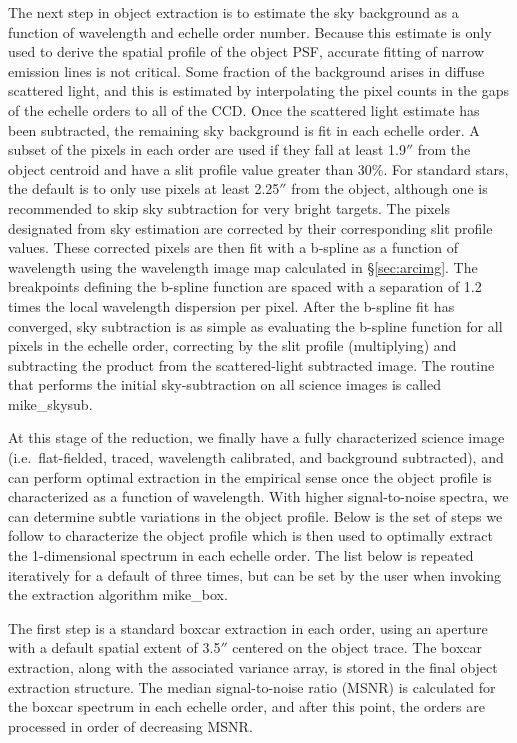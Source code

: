 \documentclass[]{emulateapj}
\begin{document}
The next step in object extraction is to estimate the sky
background as a function of wavelength and echelle order number.  
Because this estimate is only used to derive the spatial profile
of the object PSF, accurate fitting of narrow emission lines is not
critical.
Some fraction of the background arises in diffuse scattered light, and
this is estimated by interpolating the pixel counts in the gaps of 
the echelle orders to all of the CCD.  Once the scattered light estimate
has been subtracted, the remaining sky background is fit in each echelle order.
A subset of the pixels in each order are used if they fall at least 1.9$''$ from
the object centroid and have a slit profile value greater than 30\%.
For standard stars, the default is to only use pixels at least 2.25$''$ from the
object, although one is recommended to skip sky subtraction for very
bright targets.  The pixels designated from sky estimation are corrected by their
corresponding slit profile values.  These corrected pixels are then fit 
with a b-spline as a function of wavelength using the wavelength image map 
calculated in \S\ref{sec:arcimg}.  The breakpoints defining the b-spline function
are spaced with a separation of 1.2 times the local wavelength dispersion
per pixel.  After the b-spline fit has converged, sky subtraction is as simple
as evaluating the b-spline function for all pixels in the echelle order, 
correcting by the slit profile (multiplying) and subtracting the product 
from the scattered-light subtracted image.
The routine that performs the initial sky-subtraction on all science images
is called mike\_skysub.

At this stage of the reduction, we finally have a fully characterized 
science image (i.e.\ flat-fielded, traced, 
wavelength calibrated, and background subtracted), 
and can perform optimal extraction in 
the empirical sense \citep[e.g.][]{optimal}
once the object profile is characterized as a function
of wavelength.  With higher signal-to-noise spectra,
we can determine subtle variations in the object profile.
Below is the set of steps we follow to characterize the object profile 
which is then used to optimally extract the 
1-dimensional spectrum in each echelle order. 
The list below is repeated iteratively for a default of three
times, but can be set by the user when invoking the extraction
algorithm mike\_box.


The first step is a standard boxcar extraction in each order, using an aperture
with a default spatial extent of 3.5$''$ centered on the object trace.
The boxcar extraction, along with the associated variance array, is
stored in the final object extraction structure. 
The median signal-to-noise ratio (MSNR) is calculated 
for the boxcar spectrum in each echelle order, and after this point, 
the orders are processed in order of decreasing MSNR. 
\end{document}
